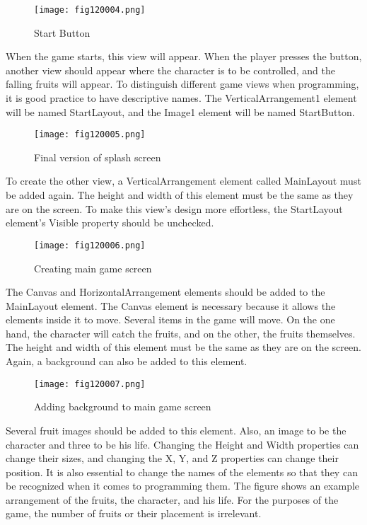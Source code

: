 \begin{figure}[H]
   \centering
   \texttt{[image: fig120004.png]}
   \caption{Start Button}
\label{fig120004}
\end{figure}

When the game starts, this view will appear. When the player presses the button, another view should appear where the character is to be controlled, and the falling fruits will appear. To distinguish different game views when programming, it is good practice to have descriptive names. The VerticalArrangement1 element will be named StartLayout, and the Image1 element will be named StartButton.

\begin{figure}[H]
   \centering
   \texttt{[image: fig120005.png]}
   \caption{Final version of splash screen}
\label{fig120005}
\end{figure}

To create the other view, a VerticalArrangement element called MainLayout must be added again. The height and width of this element must be the same as they are on the screen. To make this view's design more effortless, the StartLayout element's Visible property should be unchecked.

\begin{figure}[H]
   \centering
   \texttt{[image: fig120006.png]}
   \caption{Creating main game screen}
\label{fig120006}
\end{figure}

The Canvas and HorizontalArrangement elements should be added to the MainLayout element.
The Canvas element is necessary because it allows the elements inside it to move. Several items in the game will move. On the one hand, the character will catch the fruits, and on the other, the fruits themselves.
The height and width of this element must be the same as they are on the screen. Again, a background can also be added to this element.

\begin{figure}[H]
   \centering
   \texttt{[image: fig120007.png]}
   \caption{Adding background to main game screen}
\label{fig120007}
\end{figure}

Several fruit images should be added to this element. Also, an image to be the character and three to be his life. Changing the Height and Width properties can change their sizes, and changing the X, Y, and Z properties can change their position. It is also essential to change the names of the elements so that they can be recognized when it comes to programming them.
The figure shows an example arrangement of the fruits, the character, and his life. For the purposes of the game, the number of fruits or their placement is irrelevant.

